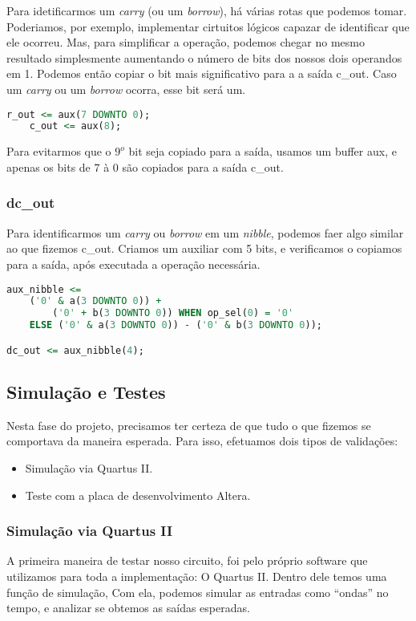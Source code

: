 \documentclass{article}
\begin{document}
Para idetificarmos um \textit{carry} (ou um \textit{borrow}), há várias rotas que podemos tomar. Poderiamos, por exemplo, implementar cirtuitos lógicos capazar de identificar que ele ocorreu. Mas, para simplificar a operação, podemos chegar no mesmo resultado simplesmente aumentando o número de bits dos nossos dois operandos em 1. Podemos então copiar o bit mais significativo para a a saída c\_out. Caso um \textit{carry} ou um \textit{borrow} ocorra, esse bit será um.

\begin{lstlisting}[language=VHDL]
    r_out <= aux(7 DOWNTO 0);
    c_out <= aux(8);
\end{lstlisting}

Para evitarmos que o $9^o$ bit seja copiado para a saída, usamos um buffer aux, e apenas os bits de 7 à 0 são copiados para a saída c\_out.

\subsubsection{dc\_out}

Para identificarmos um \textit{carry} ou \textit{borrow} em um \textit{nibble}, podemos faer algo similar ao que fizemos c\_out. Criamos um auxiliar com 5 bits, e verificamos o copiamos para a saída, após executada a operação necessária.

\begin{lstlisting}[language=VHDL]
aux_nibble <=
    ('0' & a(3 DOWNTO 0)) +
        ('0' + b(3 DOWNTO 0)) WHEN op_sel(0) = '0' 
	ELSE ('0' & a(3 DOWNTO 0)) - ('0' & b(3 DOWNTO 0));

dc_out <= aux_nibble(4);
\end{lstlisting}

\subsection{Simulação e Testes}
Nesta fase do projeto, precisamos ter certeza de que tudo o que fizemos se comportava da maneira esperada. Para isso, efetuamos dois tipos de validações:

\begin{itemize}
    \item Simulação via Quartus II.
    \item Teste com a placa de desenvolvimento Altera.
\end{itemize}

\subsubsection{Simulação via Quartus II}
A primeira maneira de testar nosso circuito, foi pelo próprio software que utilizamos para toda a implementação: O Quartus II. Dentro dele temos uma função de simulação, Com ela, podemos simular as entradas como ``ondas'' no tempo, e analizar se obtemos as saídas esperadas.
\end{document}
